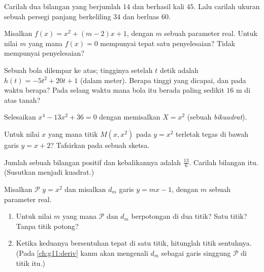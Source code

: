 \begin{exercise}[$\star\star$]\label{exo:g11:quad:5}
Carilah dua bilangan yang berjumlah $14$ dan berhasil kali $45$. Lalu carilah
ukuran sebuah persegi panjang berkeliling $34$ dan berluas $60$.
\end{exercise}

\begin{exercise}[$\star\star$]\label{exo:g11:quad:6}
Misalkan $f(x) = x^2 + (m-2)x + 1$, dengan $m$ sebuah parameter real. Untuk
nilai $m$ yang mana  $f(x) = 0$ mempunyai tepat satu penyelesaian?
Tidak mempunyai penyelesaian?
\end{exercise}

\begin{exercise}[$\star\star$]\label{exo:g11:quad:7}
Sebuah bola dilempar ke atas; tingginya setelah $t$ detik adalah
$h(t) = -5t^2 + 20t + 1$ (dalam meter). Berapa tinggi  yang dicapai,
dan pada waktu berapa? Pada selang waktu mana bola itu berada paling sedikit
$16$ m di atas tanah?
\end{exercise}

\begin{exercise}[$\star\star$]\label{exo:g11:quad:8}
Selesaikan  $x^4 - 13x^2 + 36 = 0$ dengan memisalkan $X = x^2$
(sebuah  \emph{bikuadrat}).
\end{exercise}

\begin{exercise}[$\star\star$]\label{exo:g11:quad:9}
Untuk nilai $x$ yang mana titik $M(x, x^2)$ pada  $y = x^2$
terletak tegas di bawah garis $y = x + 2$? Tafsirkan pada sebuah sketsa.
\end{exercise}

\begin{exercise}[$\star\star$]\label{exo:g11:quad:10}
Jumlah sebuah bilangan positif dan kebalikannya adalah $\frac{13}{6}$. Carilah
bilangan itu. (Susutkan menjadi  kuadrat.)
\end{exercise}

\begin{exercise}[$\star\star\star$]\label{exo:g11:quad:11}
Misalkan $\mathcal P$  $y = x^2$ dan misalkan $d_m$ garis
$y = mx - 1$, dengan $m$ sebuah parameter real.
\begin{enumerate}
  \item Untuk nilai $m$ yang mana $\mathcal P$ dan $d_m$ berpotongan di dua
        titik? Satu titik? Tanpa titik potong?
  \item Ketika keduanya bersentuhan tepat di satu titik, hitunglah titik
        sentuhnya. (Pada \cref{ch:g11:deriv} kamu akan mengenali $d_m$ sebagai
        garis singgung $\mathcal P$ di titik itu.)
\end{enumerate}
\end{exercise}

